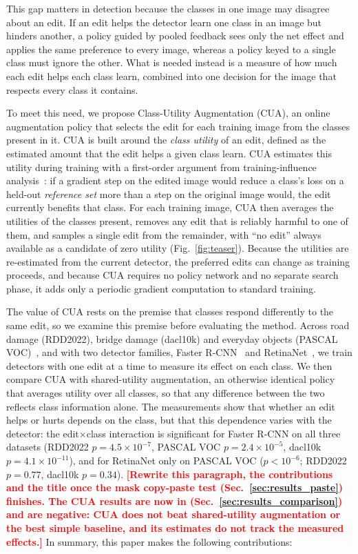 \documentclass[conference]{IEEEtran}
\newcommand{\todo}[1]{\textcolor{red}{\textbf{[#1]}}}
\begin{document}
This gap matters in detection because the classes in one image may disagree about an edit. If an edit helps the detector learn one class in an image but hinders another, a policy guided by pooled feedback sees only the net effect and applies the same preference to every image, whereas a policy keyed to a single class must ignore the other. What is needed instead is a measure of how much each edit helps each class learn, combined into one decision for the image that respects every class it contains.

To meet this need, we propose Class-Utility Augmentation (CUA), an online augmentation policy that selects the edit for each training image from the classes present in it. CUA is built around the \emph{class utility} of an edit, defined as the estimated amount that the edit helps a given class learn. CUA estimates this utility during training with a first-order argument from training-influence analysis~\cite{pruthi2020tracin}: if a gradient step on the edited image would reduce a class's loss on a held-out \emph{reference set} more than a step on the original image would, the edit currently benefits that class. For each training image, CUA then averages the utilities of the classes present, removes any edit that is reliably harmful to one of them, and samples a single edit from the remainder, with ``no edit'' always available as a candidate of zero utility (Fig.~\ref{fig:teaser}). Because the utilities are re-estimated from the current detector, the preferred edits can change as training proceeds, and because CUA requires no policy network and no separate search phase, it adds only a periodic gradient computation to standard training.

The value of CUA rests on the premise that classes respond differently to the same edit, so we examine this premise before evaluating the method. Across road damage (RDD2022), bridge damage (dacl10k) and everyday objects (PASCAL VOC)~\cite{everingham2010voc}, and with two detector families, Faster R-CNN~\cite{ren2017faster} and RetinaNet~\cite{lin2017focal}, we train detectors with one edit at a time to measure its effect on each class. We then compare CUA with shared-utility augmentation, an otherwise identical policy that averages utility over all classes, so that any difference between the two reflects class information alone. The measurements show that whether an edit helps or hurts depends on the class, but that this dependence varies with the detector: the edit$\times$class interaction is significant for Faster R-CNN on all three datasets (RDD2022 $p=4.5\times10^{-7}$, PASCAL VOC $p=2.4\times10^{-5}$, dacl10k $p=4.1\times10^{-11}$), and for RetinaNet only on PASCAL VOC ($p<10^{-6}$; RDD2022 $p=0.77$, dacl10k $p=0.34$). \todo{Rewrite this paragraph, the contributions and the title once the mask copy-paste test (Sec.~\ref{sec:results_paste}) finishes. The CUA results are now in (Sec.~\ref{sec:results_comparison}) and are negative: CUA does not beat shared-utility augmentation or the best simple baseline, and its estimates do not track the measured effects.} In summary, this paper makes the following contributions:
\end{document}
